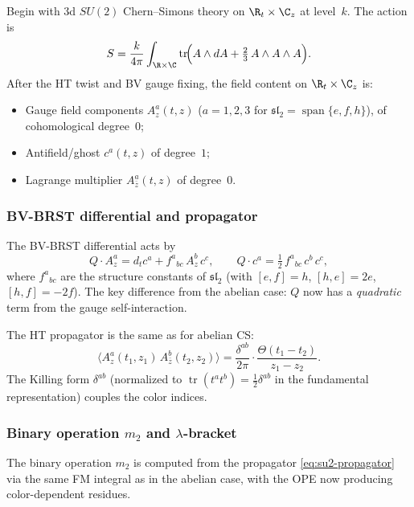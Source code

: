 Begin with 3d $SU(2)$ Chern--Simons theory on $\R_t \times \C_z$
at level~$k$. The action is
\begin{equation}%
S = \frac{k}{4\pi} \int_{\R \times \C}
 \operatorname{tr}\!\Bigl(
 A \wedge dA + \tfrac{2}{3}\, A \wedge A \wedge A
 \Bigr).
\end{equation}
After the HT twist and BV gauge fixing, the field content on
$\R_t \times \C_z$ is:
\begin{itemize}
\item Gauge field components
 $A_z^a(t,z)$ ($a = 1,2,3$ for
 $\mathfrak{sl}_2 = \operatorname{span}\{e,f,h\}$),
 of cohomological degree~$0$;
\item Antifield/ghost $c^a(t,z)$ of degree~$1$;
\item Lagrange multiplier
 $A_{\bar z}^a(t,z)$ of degree~$0$.
\end{itemize}

\subsubsection{BV-BRST differential and propagator}

The BV-BRST differential acts by
\begin{equation}%
Q \cdot A_z^a = d_t c^a + f^a{}_{bc}\, A_z^b\, c^c,
\qquad
Q \cdot c^a = \tfrac{1}{2}\, f^a{}_{bc}\, c^b\, c^c,
\end{equation}
where $f^a{}_{bc}$ are the structure constants of
$\mathfrak{sl}_2$ (with $[e,f] = h$, $[h,e] = 2e$,
$[h,f] = -2f$). The key difference from the abelian case:
$Q$ now has a \emph{quadratic} term from the gauge
self-interaction.

The HT propagator is the same as for abelian CS:
\begin{equation}%
\langle A_z^a(t_1,z_1)\, A_{\bar z}^b(t_2,z_2) \rangle
= \frac{\delta^{ab}}{2\pi} \cdot
 \frac{\Theta(t_1 - t_2)}{z_1 - z_2}.
\end{equation}
The Killing form $\delta^{ab}$ (normalized to
$\operatorname{tr}(t^a t^b) = \frac{1}{2}\delta^{ab}$
in the fundamental representation) couples the color indices.

\subsubsection{Binary operation $m_2$ and $\lambda$-bracket}

The binary operation $m_2$ is computed from the propagator
\eqref{eq:su2-propagator} via the same FM integral as in the
abelian case, with the OPE now producing color-dependent
residues.

